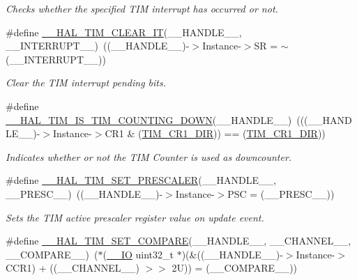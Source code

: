 \begin{DoxyCompactItemize}
\begin{DoxyCompactList}\small\item\em Checks whether the specified T\+IM interrupt has occurred or not. \end{DoxyCompactList}\item 
\#define \hyperlink{group___t_i_m___exported___macros_gaea68155ce77e591e0c2582def061d6f0}{\+\_\+\+\_\+\+H\+A\+L\+\_\+\+T\+I\+M\+\_\+\+C\+L\+E\+A\+R\+\_\+\+IT}(\+\_\+\+\_\+\+H\+A\+N\+D\+L\+E\+\_\+\+\_\+,  \+\_\+\+\_\+\+I\+N\+T\+E\+R\+R\+U\+P\+T\+\_\+\+\_\+)~((\+\_\+\+\_\+\+H\+A\+N\+D\+L\+E\+\_\+\+\_\+)-\/$>$Instance-\/$>$SR = $\sim$(\+\_\+\+\_\+\+I\+N\+T\+E\+R\+R\+U\+P\+T\+\_\+\+\_\+))
\begin{DoxyCompactList}\small\item\em Clear the T\+IM interrupt pending bits. \end{DoxyCompactList}\item 
\#define \hyperlink{group___t_i_m___exported___macros_gac73f5e7669d92971830481e7298e98ba}{\+\_\+\+\_\+\+H\+A\+L\+\_\+\+T\+I\+M\+\_\+\+I\+S\+\_\+\+T\+I\+M\+\_\+\+C\+O\+U\+N\+T\+I\+N\+G\+\_\+\+D\+O\+WN}(\+\_\+\+\_\+\+H\+A\+N\+D\+L\+E\+\_\+\+\_\+)~(((\+\_\+\+\_\+\+H\+A\+N\+D\+L\+E\+\_\+\+\_\+)-\/$>$Instance-\/$>$C\+R1 \& (\hyperlink{group___peripheral___registers___bits___definition_gacea10770904af189f3aaeb97b45722aa}{T\+I\+M\+\_\+\+C\+R1\+\_\+\+D\+IR})) == (\hyperlink{group___peripheral___registers___bits___definition_gacea10770904af189f3aaeb97b45722aa}{T\+I\+M\+\_\+\+C\+R1\+\_\+\+D\+IR}))
\begin{DoxyCompactList}\small\item\em Indicates whether or not the T\+IM Counter is used as downcounter. \end{DoxyCompactList}\item 
\#define \hyperlink{group___t_i_m___exported___macros_gafdc5a06eab07e0c24e729fd492bdb27c}{\+\_\+\+\_\+\+H\+A\+L\+\_\+\+T\+I\+M\+\_\+\+S\+E\+T\+\_\+\+P\+R\+E\+S\+C\+A\+L\+ER}(\+\_\+\+\_\+\+H\+A\+N\+D\+L\+E\+\_\+\+\_\+,  \+\_\+\+\_\+\+P\+R\+E\+S\+C\+\_\+\+\_\+)~((\+\_\+\+\_\+\+H\+A\+N\+D\+L\+E\+\_\+\+\_\+)-\/$>$Instance-\/$>$P\+SC = (\+\_\+\+\_\+\+P\+R\+E\+S\+C\+\_\+\+\_\+))
\begin{DoxyCompactList}\small\item\em Sets the T\+IM active prescaler register value on update event. \end{DoxyCompactList}\item 
\#define \hyperlink{group___t_i_m___exported___macros_ga300d0c9624c3b072d3afeb7cef639b66}{\+\_\+\+\_\+\+H\+A\+L\+\_\+\+T\+I\+M\+\_\+\+S\+E\+T\+\_\+\+C\+O\+M\+P\+A\+RE}(\+\_\+\+\_\+\+H\+A\+N\+D\+L\+E\+\_\+\+\_\+,  \+\_\+\+\_\+\+C\+H\+A\+N\+N\+E\+L\+\_\+\+\_\+,  \+\_\+\+\_\+\+C\+O\+M\+P\+A\+R\+E\+\_\+\+\_\+)~($\ast$(\hyperlink{core__sc300_8h_aec43007d9998a0a0e01faede4133d6be}{\+\_\+\+\_\+\+IO} uint32\+\_\+t $\ast$)(\&((\+\_\+\+\_\+\+H\+A\+N\+D\+L\+E\+\_\+\+\_\+)-\/$>$Instance-\/$>$C\+C\+R1) + ((\+\_\+\+\_\+\+C\+H\+A\+N\+N\+E\+L\+\_\+\+\_\+) $>$$>$ 2\+U)) = (\+\_\+\+\_\+\+C\+O\+M\+P\+A\+R\+E\+\_\+\+\_\+))
$$
\end{DoxyCompactItemize}
